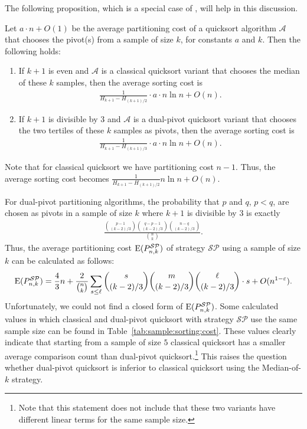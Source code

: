 \documentclass[prodmode,acmtalg]{acmsmall}
\newcommand{\E}{\textnormal{\textrm{E}}}
\begin{document}
The following proposition, which is a special case of \cite[Proposition
III.9 and Proposition III.10]{hennequin}, will help in this
discussion.
\begin{proposition}
    Let $a \cdot n + O(1)$ be the average partitioning cost of a quicksort
    algorithm $\mathcal{A}$ that chooses the pivot(s) from a sample of size $k$,
    for constants $a$ and $k$. Then the following holds:
    \begin{enumerate}
	\item If $k+1$ is even and $\mathcal{A}$ is a classical quicksort
	    variant that chooses the median of these $k$ samples, then the
	    average sorting cost is
	    \begin{align*}
	    \frac{1}{H_{k+1} - H_{(k+1)/2}} \cdot a \cdot n \ln n + O(n).
	    \end{align*}
	\item If $k+1$ is divisible by 3 and $\mathcal{A}$ is a dual-pivot quicksort
	    variant that chooses the two tertiles of these $k$ samples as pivots, then the
	    average sorting cost is
	    \begin{align*}
	    \frac{1}{H_{k+1} - H_{(k+1)/3}} \cdot a \cdot n \ln n + O(n).
	    \end{align*}
    \end{enumerate}
\end{proposition}
Note that for classical quicksort we have partitioning cost $n - 1$.
Thus, the average sorting cost becomes $\frac{1}{H_{k+1} - H_{(k+1)/2}} n \ln n
+ O(n)$.

For dual-pivot partitioning algorithms, the
probability that $p$ and $q$, $p < q$, are chosen as pivots in a sample of size
$k$ where $k+1$ is divisible by $3$ is exactly
\begin{align*}
    \frac{\binom{p-1}{(k-2)/3}\binom{q-p-1}{(k-2)/3}\binom{n-q}{(k-2)/3}}{\binom{n}{k}}.
\end{align*}
Thus, the average partitioning cost $\E(P^\mathcal{SP}_{n,k})$ of strategy $\mathcal{SP}$ using a sample of size
$k$ can be calculated as follows:
\begin{align}\label{eq:700}
    \E(P^\mathcal{SP}_{n,k}) = \frac{4}{3}n +  \frac{2}{\binom{n}{k}}\sum_{s
    \leq \ell}\binom{s}{(k-2)/3}\binom{m}{(k-2)/3}\binom{\ell}{(k-2)/3} \cdot s + O(n^{1 - \varepsilon}).
\end{align}
Unfortunately, we could not find a closed form of $\E(P^\mathcal{SP}_{n,k})$.
Some calculated values in which classical and dual-pivot quicksort with strategy $\mathcal{SP}$
use the same
sample size can be found in Table~\ref{tab:sample:sorting:cost}. These values
clearly indicate that starting from a sample of size $5$ classical quicksort has
a smaller average comparison count than dual-pivot quicksort.\footnote{Note that
this statement does not include that these two variants have different linear terms 
for the same sample size.} This raises the question whether
dual-pivot quicksort is inferior to classical quicksort using the Median-of-$k$ strategy. 
\end{document}
